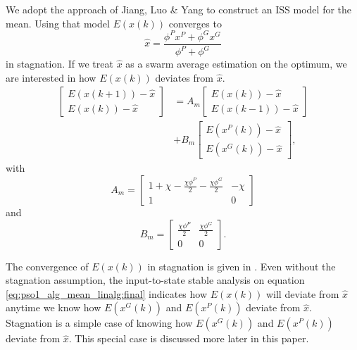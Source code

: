 We adopt the approach of Jiang, Luo \& Yang \cite{Jiang20078} to construct an ISS model for the mean.
Using that model $ E( x(k) ) $ converges to 
\begin{equation}
\nonumber
\hat{x} = \frac{\phi^{P} x^{P} + \phi^{G} x^{G} }{ \phi^{P} + \phi^{G} } 
\end{equation}
in stagnation.
If we treat $ \hat{x} $ as a swarm average estimation on the optimum, we are interested in how $ E( x(k) ) $ deviates from $ \hat{x} $.
\begin{equation}
\label{eq:pso1_alg_mean_linalg:final}
\begin{aligned}
\begin{bmatrix}
E( x(k+1) ) - \hat{x} \\
E( x(k) ) - \hat{x}
\end{bmatrix}
& = 
A_{m}
\begin{bmatrix}
E( x(k) ) - \hat{x} \\
E( x(k-1) ) - \hat{x}
\end{bmatrix}
\\ & +
B_{m}
\begin{bmatrix}
E( x^{P}(k) ) - \hat{x}\\
E( x^{G}(k) ) - \hat{x}
\end{bmatrix},
\end{aligned}
\end{equation}
with 
\begin{equation}
\nonumber
A_{m} = \begin{bmatrix}
1 + \chi - \frac{ \chi \phi^{P} }{2} - \frac{ \chi \phi^{G} }{2} & -\chi \\
1 & 0
\end{bmatrix}
\end{equation}
and
\begin{equation}
\nonumber
B_{m} = \begin{bmatrix}
\frac{ \chi \phi^{P} }{2} & \frac{ \chi \phi^{G} }{2} \\
0 & 0
\end{bmatrix}.
\end{equation}

The convergence of $ E( x(k) ) $ in stagnation is given in \cite{Jiang20078,Poli:2008:DSS:1384929.1384944}.
Even without the stagnation assumption, 
the input-to-state stable analysis on equation \eqref{eq:pso1_alg_mean_linalg:final} indicates how $ E(x(k)) $ will deviate from $ \hat{x} $ anytime we know how $ E( x^{G}(k) ) $ and $ E( x^{P}(k) ) $ deviate from $ \hat{x} $. Stagnation is a simple case of knowing how $ E( x^{G}(k) ) $ and $ E( x^{P}(k) ) $ deviate from $ \hat{x} $. This special case is discussed more later in this paper.

